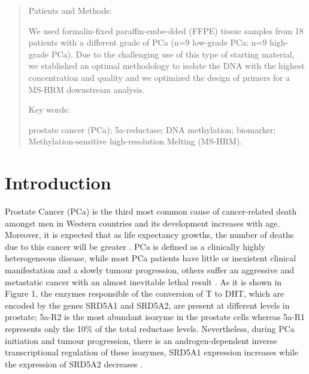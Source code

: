 \documentclass[a4paper,11pt]{article}
\begin{document}
\begin{abstract}
		\begin{bf} Patients and Methods: \end{bf} We used formalin-fixed paraffin-embe-dded (FFPE) tissue samples from 18 patients with a different grade of PCa (n=9 low-grade PCa; n=9 high-grade PCa). Due to the challenging use of this type of starting material, we stablished an optimal methodology to isolate the DNA with the highest concentration and quality and we optimized the design of primers for a MS-HRM downstream analysis. \\
		\begin{bf}Key words: \end{bf}prostate cancer (PCa); 5a-reductase; DNA methylation; biomarker; Methylation-sensitive high-resolution Melting (MS-HRM).\end{abstract}
	
			
\section{Introduction}
	Prostate Cancer (PCa) is the third most common cause of cancer-related death amongst men in Western countries and its development increases with age. Moreover, it is expected that as life expectancy growths, the number of deaths due to this cancer will be greater \cite{Bashir2015, Thompson2013}. PCa is defined as a clinically highly heterogeneous disease, while most PCa patients have little or inexistent clinical manifestation and a slowly tumour progression, others suffer an aggressive and metastatic cancer with an almost inevitable lethal result \cite{Albertsen2005}. As it is shown in Figure 1, the enzymes responsible of the conversion of T to DHT, which are encoded by the genes SRD5A1 and SRD5A2, are present at different levels in prostate; 5a-R2 is the most abundant isozyme in the prostate cells whereas 5a-R1 represents only the 10\% of the total reductase levels. Nevertheless, during PCa initiation and tumour progression, there is an androgen-dependent inverse transcriptional regulation of these isozymes, SRD5A1 expression increases while the expression of SRD5A2 decreases \cite{Steers2001}.  \\ 
\end{document}
